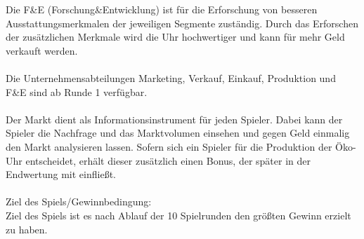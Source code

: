 Die F\&E (Forschung\&Entwicklung) ist für die Erforschung von besseren Ausstattungsmerkmalen der jeweiligen Segmente zuständig. Durch das Erforschen der zusätzlichen Merkmale wird die Uhr hochwertiger und kann für mehr Geld verkauft werden.\\
\\
Die Unternehmensabteilungen Marketing, Verkauf, Einkauf, Produktion und F\&E sind ab Runde 1 verfügbar.\\
\\
Der Markt dient als Informationsinstrument für jeden Spieler. Dabei kann der Spieler die Nachfrage und das Marktvolumen einsehen und gegen Geld einmalig den Markt analysieren lassen. Sofern sich ein Spieler für die Produktion der Öko-Uhr entscheidet, erhält dieser zusätzlich einen Bonus, der später in der Endwertung mit einfließt.\\ 
\\
Ziel des Spiels/Gewinnbedingung:\\
Ziel des Spiels ist es nach Ablauf der 10 Spielrunden den größten Gewinn erzielt zu haben.


